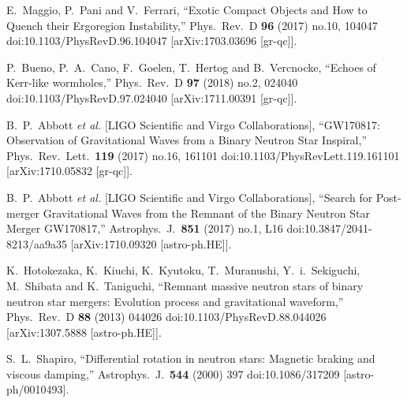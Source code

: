 \documentclass[12pt]{article}
\begin{document}
\begin{thebibliography}{99}
  E.~Maggio, P.~Pani and V.~Ferrari,
  ``Exotic Compact Objects and How to Quench their Ergoregion Instability,''
  Phys.\ Rev.\ D {\bf 96} (2017) no.10,  104047
  doi:10.1103/PhysRevD.96.104047
  [arXiv:1703.03696 [gr-qc]].
  
  P.~Bueno, P.~A.~Cano, F.~Goelen, T.~Hertog and B.~Vercnocke,
  ``Echoes of Kerr-like wormholes,''
  Phys.\ Rev.\ D {\bf 97} (2018) no.2,  024040
  doi:10.1103/PhysRevD.97.024040
  [arXiv:1711.00391 [gr-qc]].

  B.~P.~Abbott {\it et al.} [LIGO Scientific and Virgo Collaborations],
  ``GW170817: Observation of Gravitational Waves from a Binary Neutron Star Inspiral,''
  Phys.\ Rev.\ Lett.\  {\bf 119} (2017) no.16,  161101
  doi:10.1103/PhysRevLett.119.161101
  [arXiv:1710.05832 [gr-qc]].
  
  B.~P.~Abbott {\it et al.} [LIGO Scientific and Virgo Collaborations],
  ``Search for Post-merger Gravitational Waves from the Remnant of the Binary Neutron Star Merger GW170817,''
  Astrophys.\ J.\  {\bf 851} (2017) no.1,  L16
  doi:10.3847/2041-8213/aa9a35
  [arXiv:1710.09320 [astro-ph.HE]].
  
  K.~Hotokezaka, K.~Kiuchi, K.~Kyutoku, T.~Muranushi, Y.~i.~Sekiguchi, M.~Shibata and K.~Taniguchi,
  ``Remnant massive neutron stars of binary neutron star mergers: Evolution process and gravitational waveform,''
  Phys.\ Rev.\ D {\bf 88} (2013) 044026
  doi:10.1103/PhysRevD.88.044026
  [arXiv:1307.5888 [astro-ph.HE]].
  
  S.~L.~Shapiro,
  ``Differential rotation in neutron stars: Magnetic braking and viscous damping,''
  Astrophys.\ J.\  {\bf 544} (2000) 397
  doi:10.1086/317209
  [astro-ph/0010493].


\end{thebibliography}
\end{document}
